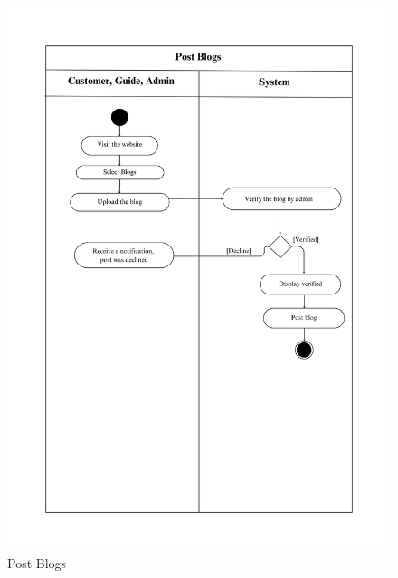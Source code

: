 \begin{figure}[h]
    \centering
    \includegraphics[width=1\textwidth]{Images/Activity Diagrams/7 Post Blogs.png}
    \caption{Post Blogs}
    \label{fig:activity-post-blog}
\end{figure}

